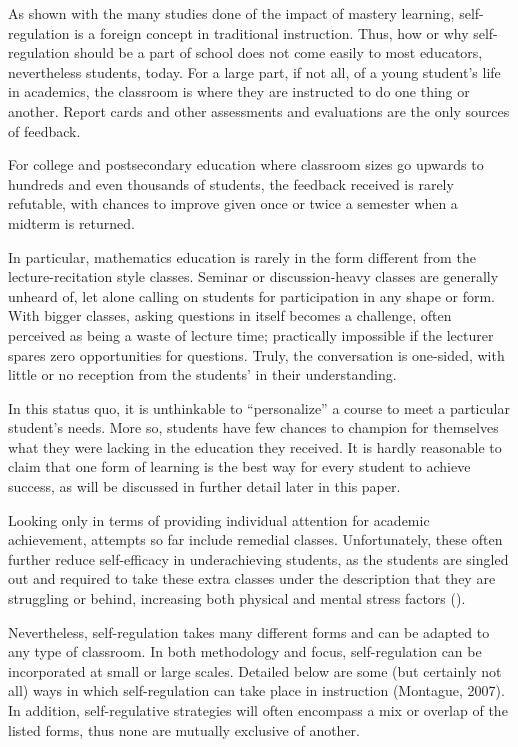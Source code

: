 As shown with the many studies done of the impact of mastery learning, self-regulation is a foreign concept in traditional instruction. Thus, how or why self-regulation should be a part of school does not come easily to most educators, nevertheless students, today. For a large part, if not all, of a young student's life in academics, the classroom is where they are instructed to do one thing or another. Report cards and other assessments and evaluations are the only sources of feedback.

For college and postsecondary education where classroom sizes go upwards to hundreds and even thousands of students, the feedback received is rarely refutable, with chances to improve given once or twice a semester when a midterm is returned.

In particular, mathematics education is rarely in the form different from the lecture-recitation style classes. Seminar or discussion-heavy classes are generally unheard of, let alone calling on students for participation in any shape or form. With bigger classes, asking questions in itself becomes a challenge, often perceived as being a waste of lecture time; practically impossible if the lecturer spares zero opportunities for questions. Truly, the conversation is one-sided, with little or no reception from the students' in their understanding.

In this status quo, it is unthinkable to ``personalize'' a course to meet a particular student's needs. More so, students have few chances to champion for themselves what they were lacking in the education they received. It is hardly reasonable to claim that one form of learning is the best way for every student to achieve success, as will be discussed in further detail later in this paper.

Looking only in terms of providing individual attention for academic achievement, attempts so far include remedial classes. Unfortunately, these often further reduce self-efficacy in underachieving students, as the students are singled out and required to take these extra classes under the description that they are struggling or behind, increasing both physical and mental stress factors (\cite{martin_developmental_2017}).

Nevertheless, self-regulation takes many different forms and can be adapted to any type of classroom. In both methodology and focus, self-regulation can be incorporated at small or large scales. Detailed below are some (but certainly not all) ways in which self-regulation can take place in instruction (Montague, 2007). In addition, self-regulative strategies will often encompass a mix or overlap of the listed forms, thus none are mutually exclusive of another.

